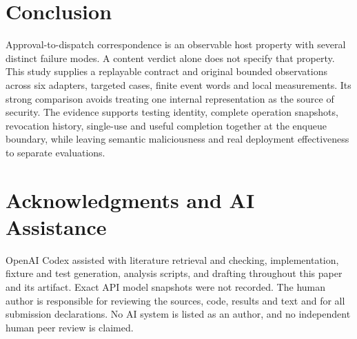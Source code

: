 \section{Conclusion}
Approval-to-dispatch correspondence is an observable host property with several
distinct failure modes. A content verdict alone does not specify that property.
This study supplies a replayable contract and original bounded observations across
six adapters, targeted cases, finite event words and local measurements. Its
strong comparison avoids treating one internal representation as the source of
security. The evidence supports testing identity, complete operation snapshots,
revocation history, single-use and useful completion together at the enqueue
boundary, while leaving semantic maliciousness and real deployment effectiveness
to separate evaluations.

\section*{Acknowledgments and AI Assistance}
OpenAI Codex assisted with literature retrieval and checking, implementation,
fixture and test generation, analysis scripts, and drafting throughout this paper
and its artifact. Exact API model snapshots were not recorded. The human author
is responsible for reviewing the sources, code, results and text and for all
submission declarations. No AI system is listed as an author, and no independent
human peer review is claimed.

